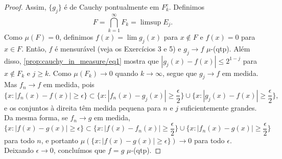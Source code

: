 \begin{proof}
    Assim, $\{g_j\}$ é de Cauchy pontualmente em $F_k^c$. Definimos $$F = \bigcap_{k=1}^\infty F_k = \limsup E_j.$$ Como $\mu(F) = 0$, definimos $f(x) = \lim g_j(x)$ para $x \notin F$ e $f(x) = 0$ para $x \in F$. Então, $f$ é mensurável (veja os Exercícios 3 e 5) e $g_j \to f$ \(\mu\)-(qtp). Além disso, \eqref{prop:cauchy_in_measure/eq1} mostra que $|g_j(x) - f(x)| \leq 2^{1-j}$ para $x \notin F_k$ e $j \geq k$. Como $\mu(F_k) \to 0$ quando $k \to \infty$, segue que $g_j \to f$ em medida. Mas $f_n \to f$ em medida, pois
    \begin{equation*}
        \{x : |f_n(x) - f(x)| \geq \epsilon\} \subset \{x : |f_n(x) - g_j(x)| \geq \frac{\epsilon}{2}\} \cup \{x : |g_j(x) - f(x)| \geq \frac{\epsilon}{2}\},
    \end{equation*}
    e os conjuntos à direita têm medida pequena para $n$ e $j$ suficientemente grandes. Da mesma forma, se $f_n \to g$ em medida,
    \begin{equation*}
        \{x : |f(x) - g(x)| \geq \epsilon\} \subset \{x : |f(x) - f_n(x)| \geq \frac{\epsilon}{2}\} \cup \{x : |f_n(x) - g(x)| \geq \frac{\epsilon}{2}\}
    \end{equation*}
    para todo $n$, e portanto $\mu(\{x : |f(x) - g(x)| \geq \epsilon\}) \to 0$ para todo $\epsilon$. Deixando $\epsilon \to 0$, concluímos que $f = g$ \(\mu\)-(qtp).


\end{proof}